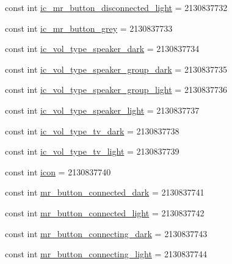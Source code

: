 \begin{CompactItemize}
\item 
const int \hyperlink{class__2doo_1_1_droid_1_1_resource_1_1_drawable_dfe5daee997daca09e8f19dfdcc827d1}{ic\_\-mr\_\-button\_\-disconnected\_\-light} = 2130837732
\item 
const int \hyperlink{class__2doo_1_1_droid_1_1_resource_1_1_drawable_6c9c19c59756879822a874f28a230f06}{ic\_\-mr\_\-button\_\-grey} = 2130837733
\item 
const int \hyperlink{class__2doo_1_1_droid_1_1_resource_1_1_drawable_856248d4c415ab66c7aa7ae711485b8c}{ic\_\-vol\_\-type\_\-speaker\_\-dark} = 2130837734
\item 
const int \hyperlink{class__2doo_1_1_droid_1_1_resource_1_1_drawable_b36bc18bbfeef4210d4920a4a6f534c2}{ic\_\-vol\_\-type\_\-speaker\_\-group\_\-dark} = 2130837735
\item 
const int \hyperlink{class__2doo_1_1_droid_1_1_resource_1_1_drawable_ff9fd7fbb95f62b98a4b9961fe50c210}{ic\_\-vol\_\-type\_\-speaker\_\-group\_\-light} = 2130837736
\item 
const int \hyperlink{class__2doo_1_1_droid_1_1_resource_1_1_drawable_d383d3d4b0f0eba511a4fd92b4e22c7d}{ic\_\-vol\_\-type\_\-speaker\_\-light} = 2130837737
\item 
const int \hyperlink{class__2doo_1_1_droid_1_1_resource_1_1_drawable_6e3e5bfeb189e5e021b8317f81f79463}{ic\_\-vol\_\-type\_\-tv\_\-dark} = 2130837738
\item 
const int \hyperlink{class__2doo_1_1_droid_1_1_resource_1_1_drawable_b270e9ba5cf2e570ee37dde6bf266a72}{ic\_\-vol\_\-type\_\-tv\_\-light} = 2130837739
\item 
const int \hyperlink{class__2doo_1_1_droid_1_1_resource_1_1_drawable_cf1ee910d23663b4ca428cd87aee6b33}{icon} = 2130837740
\item 
const int \hyperlink{class__2doo_1_1_droid_1_1_resource_1_1_drawable_c81ed0db3c9c791c6dcef493c0911c2b}{mr\_\-button\_\-connected\_\-dark} = 2130837741
\item 
const int \hyperlink{class__2doo_1_1_droid_1_1_resource_1_1_drawable_e05ce956d6d93fa81567f19400ee7512}{mr\_\-button\_\-connected\_\-light} = 2130837742
\item 
const int \hyperlink{class__2doo_1_1_droid_1_1_resource_1_1_drawable_d9fed8e0b68cdc4c73f305cee1fc9eb5}{mr\_\-button\_\-connecting\_\-dark} = 2130837743
\item 
const int \hyperlink{class__2doo_1_1_droid_1_1_resource_1_1_drawable_bb3d8d82467b2985650e85f448160a2b}{mr\_\-button\_\-connecting\_\-light} = 2130837744
\item 

\end{CompactItemize}
